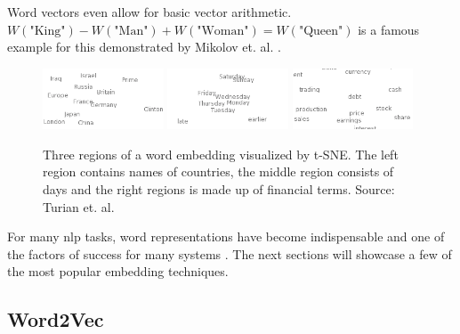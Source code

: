 Word vectors even allow for basic vector arithmetic. $W(\text{"King"})-W(\text{"Man"})+W(\text{"Woman"})=W(\text{"Queen"})$ is a famous example for this demonstrated by Mikolov et. al. \cite{Mikolov2013d}.
\medskip

\begin{figure}[ht]
	\centering
	\includegraphics[width=0.32\textwidth]{figures/03_theory/03_wordEmbeddings1}
	\includegraphics[width=0.32\textwidth]{figures/03_theory/03_wordEmbeddings2}
	\includegraphics[width=0.32\textwidth]{figures/03_theory/03_wordEmbeddings3}
	\caption[Three regions of a word embedding visualized by t-SNE. Source: Turian et. al. \cite{Turian2010} - Source for full image \url{http://metaoptimize.s3.amazonaws.com/cw-embeddings-ACL2010/embeddings-mostcommon.EMBEDDING_SIZE=50.png}]{Three regions of a word embedding visualized by t-SNE. The left region contains names of countries, the middle region consists of days and the right regions is made up of financial terms. Source: Turian et. al. \cite{Turian2010}\protect\footnotemark}
	\label{fig:03_WordEmbeddings}
\end{figure}

For many \gls{nlp} tasks, word representations have become indispensable and one of the factors of success for many systems \cite{Luong2013}. The next sections will showcase a few of the most popular embedding techniques.

\subsection{Word2Vec}
\label{sec:03_word2vec}


